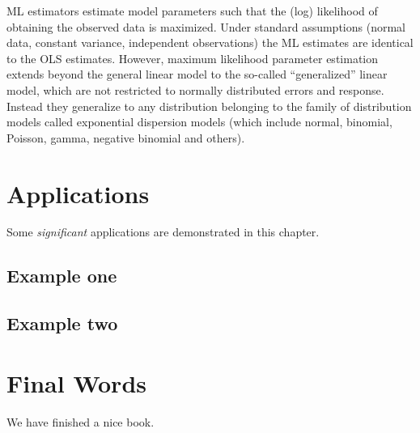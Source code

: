 \documentclass[
]{book}
\begin{document}
ML estimators estimate model parameters such that the (log) likelihood of obtaining the observed data is maximized. Under standard assumptions (normal data, constant variance, independent observations) the ML estimates are identical to the OLS estimates. However, maximum likelihood parameter estimation extends beyond the general linear model to the so-called ``generalized'' linear model, which are not restricted to normally distributed errors and response. Instead they generalize to any distribution belonging to the family of distribution models called exponential dispersion models (which include normal, binomial, Poisson, gamma, negative binomial and others).

\hypertarget{applications}{%
\chapter{Applications}\label{applications}}

Some \emph{significant} applications are demonstrated in this chapter.

\hypertarget{example-one}{%
\section{Example one}\label{example-one}}

\hypertarget{example-two}{%
\section{Example two}\label{example-two}}

\hypertarget{final-words}{%
\chapter{Final Words}\label{final-words}}

We have finished a nice book.

  
\end{document}
